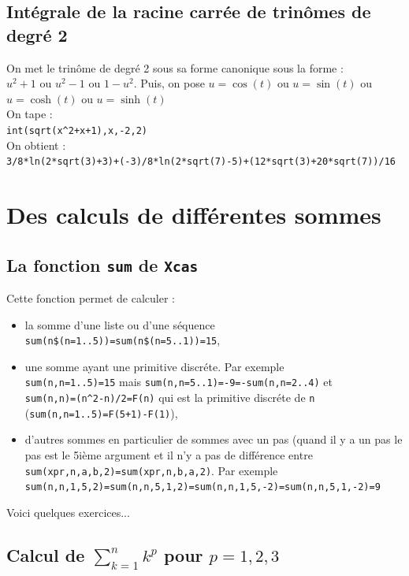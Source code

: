 \documentclass[a4paper,11pt]{book}
\begin{document}
\section{Int\'egrale de la racine carr\'ee de trin\^omes de degr\'e 2}
On met le trin\^ome de degr\'e 2 sous sa forme canonique sous la forme :\\
$u^2+1$ ou $u^2-1$ ou $1-u^2$. Puis, on pose $u=\cos(t)$ ou $u=\sin(t)$ ou 
$u=\cosh(t)$ ou $u=\sinh(t)$ \\
\noindent On tape :\\
{\tt int(sqrt(x\verb|^|2+x+1),x,-2,2)}\\   
On obtient :\\
{\tt 3/8*ln(2*sqrt(3)+3)+(-3)/8*ln(2*sqrt(7)-5)+(12*sqrt(3)+20*sqrt(7))/16}\\

\chapter{Des calculs de diff\'erentes sommes}
\section{La fonction {\tt sum} de {\tt Xcas}}
Cette fonction permet de calculer :
\begin{itemize}
\item la somme d'une liste ou d'une s\'equence \\
{\tt sum(n\$(n=1..5))=sum(n\$(n=5..1))=15}, 
\item une somme ayant une primitive discr\'ete. Par exemple\\  
{\tt sum(n,n=1..5)=15} mais {\tt sum(n,n=5..1)=-9=-sum(n,n=2..4)} et\\
{\tt sum(n,n)=(n\verb|^|2-n)/2=F(n)} qui est la primitive discr\'ete de {\tt n}
({\tt sum(n,n=1..5)=F(5+1)-F(1)}),
\item d'autres sommes en particulier de sommes avec un pas (quand il y a un 
pas le pas est le 5i\`eme argument et il n'y a pas de diff\'erence entre 
{\tt sum(xpr,n,a,b,2)=sum(xpr,n,b,a,2)}. Par exemple\\  
{\tt sum(n,n,1,5,2)=sum(n,n,5,1,2)=sum(n,n,1,5,-2)=sum(n,n,5,1,-2)=9}
\end{itemize}
Voici quelques exercices...

\section{Calcul de $\sum_{k=1}^nk^p$ pour $p=1,2,3$}
\end{document}
